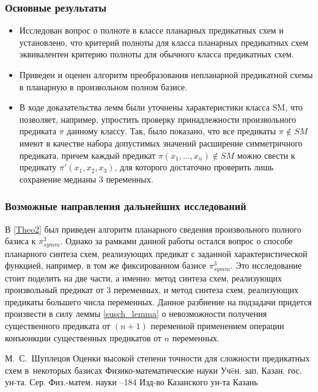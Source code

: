 \documentclass[12pt]{extarticle}
\begin{document}
\subsubsection*{Основные результаты}

\begin{itemize}
\item Исследован вопрос о полноте в классе планарных предикатных схем и установлено, что 
критерий полноты для класса планарных предикатных схем эквивалентен критерию полноты для обычного
класса предикатных схем. 
\item Приведен и оценен алгоритм преобразования непланарной предикатной схемы в планарную 
в произвольном полном базисе. 
\item
В ходе доказательства лемм были уточнены характеристики класса SM, что 
позволяет, например, упростить проверку принадлежности произвольного предиката $\pi$ данному классу. 
Так, было показано, что все предикаты $\pi \notin SM$ имеют в качестве набора допустимых значений расширение симметричного
предиката, причем каждый предикат $\pi(x_1, \dots, x_n) \notin SM$ можно свести к предикату $\pi'(x_1, x_2, x_3)$, 
для которого достаточно проверить лишь сохранение медианы 3 переменных.
\end{itemize}

\subsubsection*{Возможные направления дальнейших исследований}

В \ref{Theo2} был приведен алгоритм планарного сведения произвольного полного базиса к $\pi_{symm}^3$.
Однако за рамками данной работы остался вопрос о способе планарного синтеза схем, реализующих предикат 
с заданной характеристической функцией, например, в том же фиксированном базисе $\pi_{symm}^3$. 
Это исследование стоит поделить на две части, а именно: 
метод синтеза схем, реализующих произвольный предикат от 3 переменных, и метод синтеза схем, реализующих предикаты
большего числа переменных. Данное разбиение на подзадачи придется произвести в силу леммы \ref{susch_lemma} 
о невозможности получения 
существенного предиката от $(n+1)$ переменной применением операции конъюнкции существенных предикатов от $n$ переменных.

\clearpage
{}
    \by М.~С.~Шуплецов
    \paper Оценки высокой степени точности для сложности предикатных схем в~некоторых базисах
    \inbook Физико-математические науки
    \serial Уч\"eн. зап. Казан. гос. ун-та. Сер. Физ.-матем. науки
    --184
    \publ Изд-во Казанского ун-та
    \publaddr Казань
\end{document}
